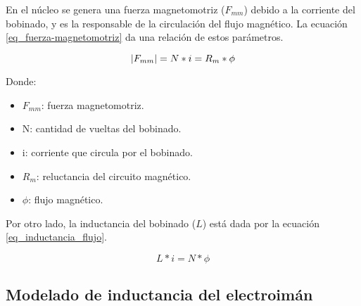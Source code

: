 \noindent En el núcleo se genera una fuerza magnetomotriz ($F_{mm}$) debido a la corriente del bobinado, y es la responsable de la circulación del flujo magnético. La ecuación \ref{eq_fuerza-magnetomotriz} da una relación de estos parámetros.	






\begin{equation} \label{eq_fuerza-magnetomotriz}
	\lvert F_{mm}\rvert=N*i=R_{m}*\phi	
\end{equation}

\noindent Donde: 
\begin{itemize}
	\item $F_{mm}$: fuerza magnetomotriz.
	\item N: cantidad de vueltas del bobinado.
	\item i: corriente que circula por el bobinado.
	\item $R_{m}$: reluctancia del circuito magnético.
	\item $\phi$: flujo magnético.
\end{itemize}


\noindent Por otro lado, la inductancia del bobinado ($L$) está dada por la ecuación \ref{eq_inductancia_flujo}.

\begin{equation} \label{eq_inductancia_flujo}
	L*i=N*\phi
\end{equation}

\subsection{Modelado de inductancia del electroimán}


